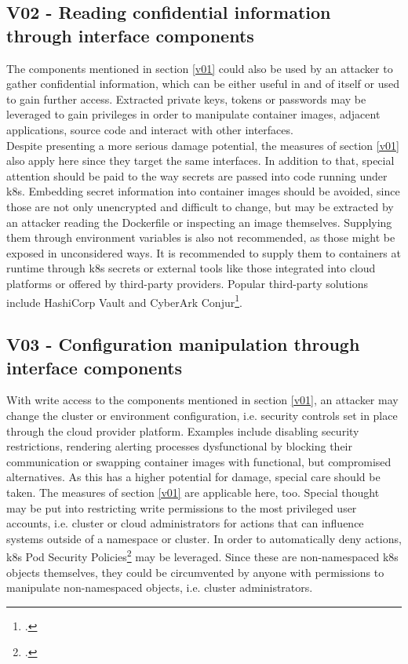 \subsection{V02 - Reading confidential information through interface components}
The components mentioned in section \ref{v01} could also be used by an attacker to gather confidential information, which can be either useful in and of itself or used to gain further access. Extracted private keys, tokens or passwords  may be leveraged to gain privileges in order to manipulate container images, adjacent applications, source code and interact with other interfaces. \\
Despite presenting a more serious damage potential, the measures of section \ref{v01} also apply here since they target the same interfaces.
In addition to that, special attention should be paid to the way secrets are passed into code running under \gls{k8s}. Embedding secret information into container images should be avoided, since those are not only unencrypted and difficult to change, but may be extracted by an attacker reading the Dockerfile or inspecting an image themselves. Supplying them through environment variables is also not recommended, as those might be exposed in unconsidered ways. It is recommended to supply them to containers at runtime through \gls{k8s} secrets or external tools like those integrated into cloud platforms or offered by third-party providers. Popular third-party solutions include HashiCorp Vault and CyberArk Conjur\footcite[][, chapter 7]{k8sBook}.

\subsection{V03 - Configuration manipulation through interface components} \label{v03}
With write access to the components mentioned in section \ref{v01}, an attacker may change the cluster or environment configuration, i.e. security controls set in place through the cloud provider platform. Examples include disabling security restrictions, rendering alerting processes dysfunctional by blocking their communication or swapping container images with functional, but compromised alternatives. 
\newpage
As this has a higher potential for damage, special care should be taken. The measures of section \ref{v01} are applicable here, too. Special thought may be put into restricting write permissions to the most privileged user accounts, i.e. cluster or cloud administrators for actions that can influence systems outside of a namespace or cluster.
In order to automatically deny actions, \gls{k8s} Pod Security Policies\footcite[][, section 'What is a Pod Security Policy?']{securityPolicy} may be leveraged. Since these are non-namespaced \gls{k8s} objects themselves, they could be circumvented by anyone with permissions to manipulate non-namespaced objects, i.e. cluster administrators.

